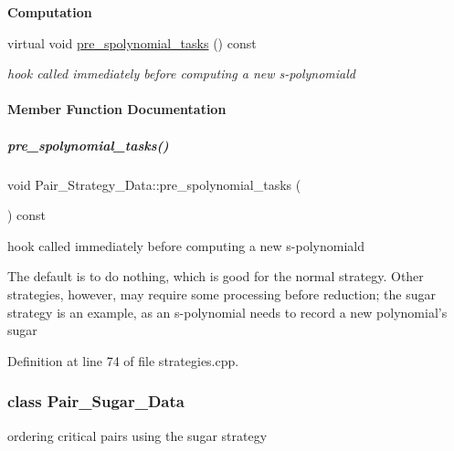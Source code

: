 \begin{Indent}\textbf{ Computation}\par
\begin{DoxyCompactItemize}
\item 
virtual void \hyperlink{group__strategygroup_a15fdaa9fa3cc0a259e7dd29df1940819}{pre\+\_\+spolynomial\+\_\+tasks} () const
\begin{DoxyCompactList}\small\item\em hook called immediately before computing a new s-\/polynomiald \end{DoxyCompactList}\end{DoxyCompactItemize}
\end{Indent}


\paragraph{Member Function Documentation}
\mbox{\label{group__strategygroup_a15fdaa9fa3cc0a259e7dd29df1940819}} 
\subparagraph{\texorpdfstring{pre\+\_\+spolynomial\+\_\+tasks()}{pre\_spolynomial\_tasks()}}
{\footnotesize\ttfamily void Pair\+\_\+\+Strategy\+\_\+\+Data\+::pre\+\_\+spolynomial\+\_\+tasks (\begin{DoxyParamCaption}{ }\end{DoxyParamCaption}) const\hspace{0.3cm}{\ttfamily [virtual]}}



hook called immediately before computing a new s-\/polynomiald 

The default is to do nothing, which is good for the normal strategy. Other strategies, however, may require some processing before reduction; the sugar strategy is an example, as an s-\/polynomial needs to record a new polynomial's sugar 

Definition at line 74 of file strategies.\+cpp.

\label{class_pair___sugar___data}
\subsubsection{class Pair\+\_\+\+Sugar\+\_\+\+Data}
ordering critical pairs using the sugar strategy 

